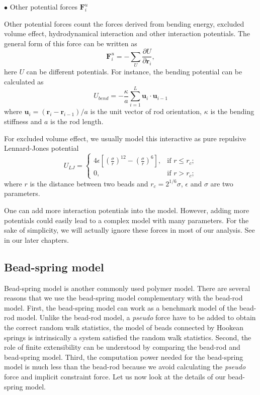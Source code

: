 $\bullet$ Other potential forces $\mathbf{F}_i^{u}$

Other potential forces count the forces derived from bending energy, excluded volume effect, hydrodynamical interaction and other interaction potentials. The general form of this force can be written as
\begin{equation}
    \label{eq:potentialForce}
    \mathbf{F}_i^{u} = -\sum_{U}\frac{\partial U}{\partial\mathbf{r}_i},
\end{equation}
here $U$ can be different potentials. For instance, the bending potential can be calculated as 
\begin{equation}
    \label{eq:bending}
    U_{bend} = - \frac{\kappa}{a} \sum_{i=1}^{L} \mathbf{u}_i \cdot \mathbf{u}_{i-1}
\end{equation}
where $\mathbf{u}_i = (\mathbf{r}_{i} - \mathbf{r}_{i-1})/a$ is the unit vector of rod orientation, $\kappa$ is the bending stiffness and $a$ is the rod length.

For excluded volume effect, we usually model this interactive as pure repulsive Lennard-Jones potential
\begin{equation}
    \label{eq:lennardJones}
    U_{LJ} =  
    \begin{cases} 
        4\epsilon\left[\left(\frac{\sigma}{r}\right)^{12} -  \left(\frac{\sigma}{r}\right)^6\right],
        & \text{if } r \leq r_c; \\
        0,       & \text{if } r > r_c;
  \end{cases}
\end{equation}
where $r$ is the distance between two beads and $r_c = 2^{1/6}\sigma$, $\epsilon$ and $\sigma$ are two parameters.

One can add more interaction potentials into the model. However, adding more potentials could easily lead to a complex model with many parameters. For the sake of simplicity, we will actually ignore these forces in most of our analysis. See in our later chapters.


\subsection{Bead-spring model}
\label{sub:bead_spring_model}

Bead-spring model is another commonly used polymer model. There are several reasons that we use the bead-spring model complementary with the bead-rod model. First, the bead-spring model can work as a benchmark model of the bead-rod model. Unlike the bead-rod model, a \emph{pseudo} force have to be added to obtain the correct random walk statistics, the model of beads connected by Hookean springs is intrinsically a system satisfied the random walk statistics. Second,  the role of finite extensibility can be understood by comparing the bead-rod and bead-spring model. Third, the computation power needed for the bead-spring model is much less than the bead-rod because we avoid calculating the \emph{pseudo} force and implicit constraint force. Let us now look at the details of our bead-spring model.


